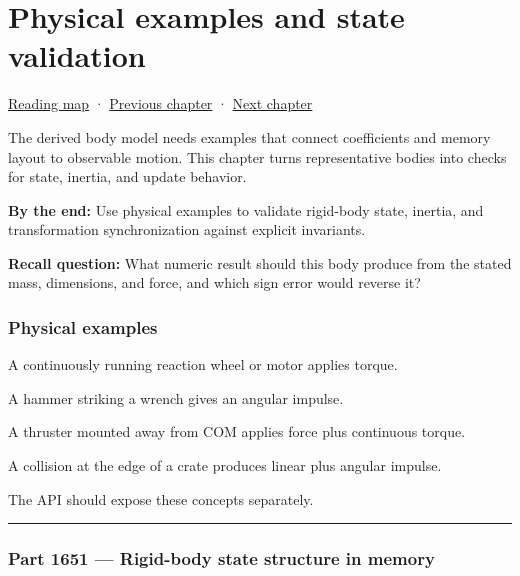 \chapter{Physical examples and state validation}\label{06-engine-ii-ch037-physical-examples-and-state-validation}\hypertarget{06-engine-ii-ch037}{}\label{stagechapter:06-engine-ii-ch037}

\hyperref[volume-reading-map]{Reading map} · \hyperref[06-engine-ii-ch036-auditing-capsule-mass-properties-and-collision-formulas]{Previous chapter} · \hyperref[06-engine-ii-ch038-integrator-choices-and-energy-drift]{Next chapter}

The derived body model needs examples that connect coefficients and memory layout to observable motion. This chapter turns representative bodies into checks for state, inertia, and update behavior.

\textbf{By the end:} Use physical examples to validate rigid-body state, inertia, and transformation synchronization against explicit invariants.

\textbf{Recall question:} What numeric result should this body produce from the stated mass, dimensions, and force, and which sign error would reverse it?

\subsection{Physical examples}\label{06-engine-ii-ch037-physical-examples}

A continuously running reaction wheel or motor applies torque.

A hammer striking a wrench gives an angular impulse.

A thruster mounted away from COM applies force plus continuous torque.

A collision at the edge of a crate produces linear plus angular impulse.

The API should expose these concepts separately.

\begin{center}\rule{0.5\linewidth}{0.5pt}\end{center}

\subsection{Part 1651 --- Rigid-body state structure in memory}\label{06-engine-ii-ch037-part-1651-rigid-body-state-structure-in-memory}

